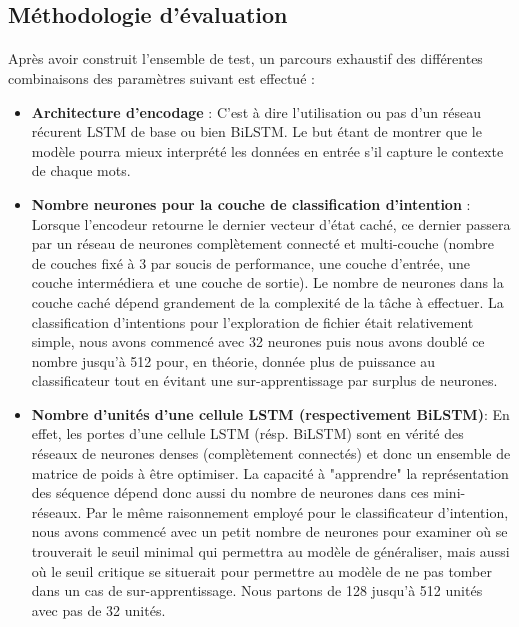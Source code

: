 	\subsection{Méthodologie d'évaluation}
	\label{nlu_steps}
	\paragraph{}
	Après avoir construit l'ensemble de test, un parcours exhaustif des différentes combinaisons des paramètres suivant est effectué : 
	\begin{itemize}
		\item \textbf{Architecture d'encodage} :
		C'est à dire l'utilisation ou pas d'un réseau récurent LSTM de base ou bien BiLSTM. Le but étant de montrer que le modèle pourra mieux interprété les données en entrée s'il capture le contexte de chaque mots.
		
		\item \textbf{Nombre neurones pour la couche de classification d'intention } : Lorsque l'encodeur retourne le dernier vecteur d'état caché, ce dernier passera par un réseau de neurones complètement connecté et multi-couche (nombre de couches fixé à 3 par soucis de performance, une couche d'entrée, une couche intermédiera et une couche de sortie). Le nombre de neurones dans la couche caché dépend grandement de la complexité de la tâche à effectuer. La classification d'intentions pour l'exploration de fichier était relativement simple, nous avons commencé avec 32 neurones puis nous avons doublé ce nombre jusqu'à 512 pour, en théorie, donnée plus de puissance au classificateur tout en évitant une sur-apprentissage par surplus de neurones.
		
		\item \textbf{Nombre d'unités d'une cellule LSTM (respectivement BiLSTM)}:
		En effet, les portes d'une cellule LSTM (résp. BiLSTM) sont en vérité des réseaux de neurones denses (complètement connectés) et donc un ensemble de matrice de poids à être optimiser. La capacité à "apprendre" la représentation des séquence dépend donc aussi du nombre de neurones dans ces mini-réseaux. Par le même raisonnement employé pour le classificateur d'intention, nous avons commencé avec un petit nombre de neurones pour examiner où se trouverait le seuil minimal qui permettra au modèle de généraliser, mais aussi où le seuil critique se situerait pour permettre au modèle de ne pas tomber dans un cas de sur-apprentissage. Nous partons de 128 jusqu'à 512 unités avec pas de 32 unités.
		

\end{itemize}
